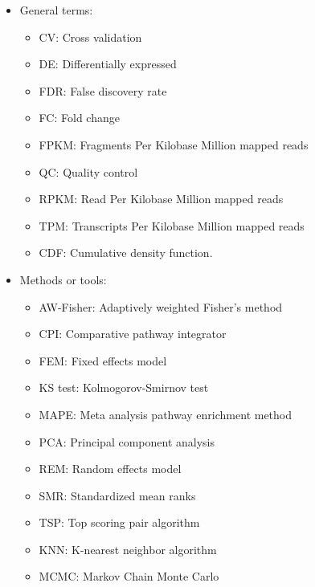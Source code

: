 \begin{itemize}
\item General terms:
\begin{itemize}
\item CV: Cross validation
\item DE:  Differentially expressed
\item FDR: False discovery rate
\item FC: Fold change
\item FPKM: Fragments Per Kilobase Million mapped reads
\item QC: Quality control
\item RPKM: Read Per Kilobase Million mapped reads
\item TPM: Transcripts Per Kilobase Million mapped reads
\item CDF: Cumulative density function.
\end{itemize}

\item Methods or tools:
\begin{itemize}
\item AW-Fisher: Adaptively weighted Fisher's method
\item CPI: Comparative pathway integrator 
\item FEM: Fixed effects model
\item KS test: Kolmogorov-Smirnov test
\item MAPE: Meta analysis pathway enrichment method
\item PCA: Principal component analysis
\item REM: Random effects model
\item SMR: Standardized mean ranks
\item TSP: Top scoring pair algorithm
\item KNN: K-nearest neighbor algorithm
\item MCMC: Markov Chain Monte Carlo

\end{itemize}

\end{itemize}


